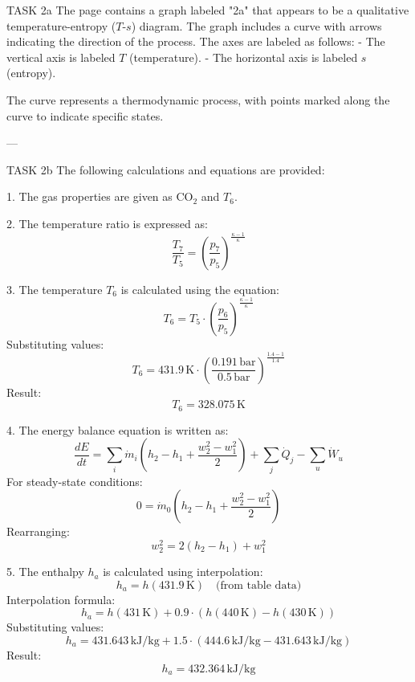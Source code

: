 TASK 2a  
The page contains a graph labeled "2a" that appears to be a qualitative temperature-entropy (\( T \)-\( s \)) diagram. The graph includes a curve with arrows indicating the direction of the process. The axes are labeled as follows:  
- The vertical axis is labeled \( T \) (temperature).  
- The horizontal axis is labeled \( s \) (entropy).  

The curve represents a thermodynamic process, with points marked along the curve to indicate specific states.  

---

TASK 2b  
The following calculations and equations are provided:  

1. The gas properties are given as \( \text{CO}_2 \) and \( T_6 \).  

2. The temperature ratio is expressed as:  
\[
\frac{T_7}{T_5} = \left( \frac{p_7}{p_5} \right)^{\frac{\kappa - 1}{\kappa}}
\]  

3. The temperature \( T_6 \) is calculated using the equation:  
\[
T_6 = T_5 \cdot \left( \frac{p_6}{p_5} \right)^{\frac{\kappa - 1}{\kappa}}
\]  
Substituting values:  
\[
T_6 = 431.9 \, \text{K} \cdot \left( \frac{0.191 \, \text{bar}}{0.5 \, \text{bar}} \right)^{\frac{1.4 - 1}{1.4}}
\]  
Result:  
\[
T_6 = 328.075 \, \text{K}
\]  

4. The energy balance equation is written as:  
\[
\frac{dE}{dt} = \sum_i \dot{m}_i \left( h_2 - h_1 + \frac{w_2^2 - w_1^2}{2} \right) + \sum_j \dot{Q}_j - \sum_u \dot{W}_u
\]  
For steady-state conditions:  
\[
0 = \dot{m}_0 \left( h_2 - h_1 + \frac{w_2^2 - w_1^2}{2} \right)
\]  
Rearranging:  
\[
w_2^2 = 2 \left( h_2 - h_1 \right) + w_1^2
\]  

5. The enthalpy \( h_a \) is calculated using interpolation:  
\[
h_a = h \left( 431.9 \, \text{K} \right) \quad \text{(from table data)}  
\]  
Interpolation formula:  
\[
h_a = h \left( 431 \, \text{K} \right) + 0.9 \cdot \left( h \left( 440 \, \text{K} \right) - h \left( 430 \, \text{K} \right) \right)
\]  
Substituting values:  
\[
h_a = 431.643 \, \text{kJ/kg} + 1.5 \cdot \left( 444.6 \, \text{kJ/kg} - 431.643 \, \text{kJ/kg} \right)
\]  
Result:  
\[
h_a = 432.364 \, \text{kJ/kg}
\]  